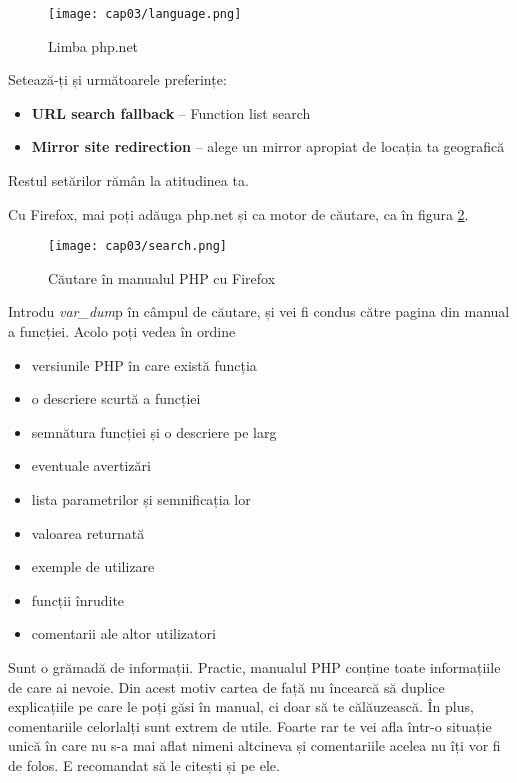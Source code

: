 \begin{figure}[ht!]
  \centering
    \texttt{[image: cap03/language.png]}
  \caption{Limba php.net}
  \label{fig:php.net lang}
\end{figure}
Setează-ți și următoarele preferințe:
\begin{itemize}
\item \textbf{URL search fallback} -- Function list search
\item \textbf{Mirror site redirection} -- alege un mirror apropiat de locația ta geografică
\end{itemize}
Restul setărilor rămân la atitudinea ta.

Cu Firefox, mai poți adăuga php.net și ca motor de căutare, ca în
figura \ref{fig:php.net search}.

\begin{figure}[ht!]
  \centering
    \texttt{[image: cap03/search.png]}
  \caption{Căutare în manualul PHP cu Firefox}
  \label{fig:php.net search}
\end{figure}

Introdu \textit{var\_dum}p în câmpul de căutare, și vei fi condus
către pagina din manual a funcției. Acolo poți vedea
în ordine
\begin{itemize}
\item versiunile PHP în care există funcția
\item o descriere scurtă a funcției
\item semnătura funcției și o descriere pe larg
\item eventuale avertizări
\item lista parametrilor și semnificația lor
\item valoarea returnată
\item exemple de utilizare
\item funcții înrudite
\item comentarii ale altor utilizatori
\end{itemize}
Sunt o grămadă de informații. Practic, manualul
PHP conține toate informațiile de care ai nevoie.
Din acest motiv cartea de față nu încearcă să 
duplice explicațiile pe care le poți găsi în manual,
ci doar să te călăuzească. În plus, comentariile
celorlalți sunt extrem de utile. Foarte rar te vei
afla într-o situație unică în care nu s-a mai aflat
nimeni altcineva și comentariile acelea nu îți vor fi de 
folos. E recomandat să le citești și pe ele.



